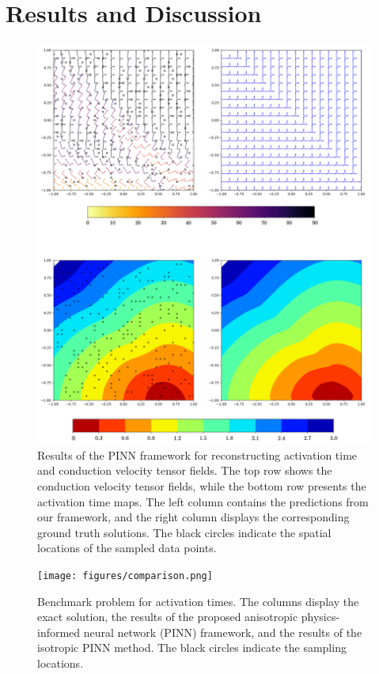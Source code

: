 \section{Results and Discussion}
\begin{figure}
    \centering
    \includegraphics[width=1\linewidth]{figures/results.png}
    \caption{Results of the PINN framework for reconstructing activation time and conduction velocity tensor fields. The top row shows the conduction velocity tensor fields, while the bottom row presents the activation time maps. The left column contains the predictions from our framework, and the right column displays the corresponding ground truth solutions. The black circles indicate the spatial locations of the sampled data points.}
    \label{fig:results}
\end{figure}
\begin{figure}
    \centering
    \texttt{[image: figures/comparison.png]} 
    \caption{Benchmark problem for activation times. The columns display the exact solution, the results of the proposed anisotropic physics-informed neural network (PINN) framework, and the results of the isotropic PINN method. The black circles indicate the sampling locations.}
    \label{fig:comparison}
\end{figure}
